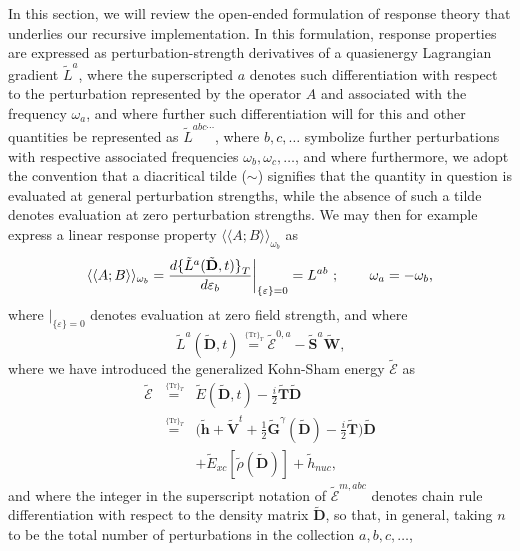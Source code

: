 \documentclass[%
 reprint,
 amsmath,amssymb,
 aps,
]{revtex4-1}
\begin{document}
In this section, we will review the open-ended formulation of response theory that underlies our recursive implementation. In this formulation, response properties are expressed as perturbation-strength derivatives of a quasienergy Lagrangian gradient $\tilde{L}^a$, where the superscripted $a$ denotes such differentiation with respect to the perturbation represented by the operator $A$ and associated with the frequency $\omega_{a}$, and where further such differentiation will for this and other quantities be represented as $\tilde{L}^{abc\cdots}$, where $b, c, \ldots$ symbolize further perturbations with respective associated frequencies $\omega_{b}, \omega_{c}, \ldots$, and where furthermore, we adopt the convention that a diacritical tilde ($\sim$) signifies that the quantity in question is evaluated at general perturbation strengths, while the absence of such a tilde denotes evaluation at zero perturbation strengths. We may then for example express a linear response property $\langle \langle A ; B \rangle \rangle_{\omega_{b}}$ as 
\begin{equation}
\label{LRF-D}
\langle \langle A ; B \rangle \rangle_{\omega_{b}} =
\frac{d { \{ \tilde{L}^a (\tilde{\mathbf{D}}, t) \} }_T }
{d\varepsilon_b} \biggr{\vert}_{
\{ \varepsilon \} = 0 } = L^{ab} \text{ ; } \qquad
\omega_a = -\omega_{b}\text{,}
\end{equation}
where $\vert_{ \{ \varepsilon \} = 0 }$ denotes evaluation at zero field strength, and where
\begin{equation}\label{La}
\tilde{L}^a (\tilde{\mathbf{D}}, t) \stackrel{\,^{\{\mathrm{Tr}\}_T}}{=} 
\tilde{\mathcal{E}}^{0, a} -  \tilde{\mathbf{S}}^a \tilde{\mathbf{W}}\text{,}
\end{equation}
where we have introduced the generalized Kohn-Sham energy $\tilde{\mathcal{E}}$ as
\begin{eqnarray}\nonumber
\tilde{\mathcal{E}} &\stackrel{\,^{\{\mathrm{Tr}\}_T}}{=}&
\tilde{E}(\tilde{\mathbf{D}}, t) - 
{\textstyle \frac{i}{2}} \tilde{\mathbf{T}} \tilde{\mathbf{D}} \\ \label{G-EKS} &\stackrel{\,^{\{\mathrm{Tr}\}_T}}{=}&
 \bigl( \tilde{\mathbf{h}} + \tilde{\mathbf{V}}^t +
{\textstyle \frac{1}{2}}
\tilde{\mathbf{G}}^{\gamma}(\tilde{\mathbf{D}}) 
 - {\textstyle \frac{i}{2}} \tilde{\mathbf{T}} \bigr) \tilde{\mathbf{D}} \\ 
\nonumber && + \tilde{E}_{xc}[\tilde{\rho}(\tilde{\mathbf{D}})]
+ \tilde{h}_{nuc}\text{,}
\end{eqnarray}
and where the integer in the superscript notation of $\tilde{\mathcal{E}}^{m, abc}$ denotes chain rule differentiation with respect to the density matrix $\tilde{\mathbf{D}}$, so that, in general, taking $n$ to be the total number of perturbations in the collection $a, b, c, \ldots$, 
\end{document}
